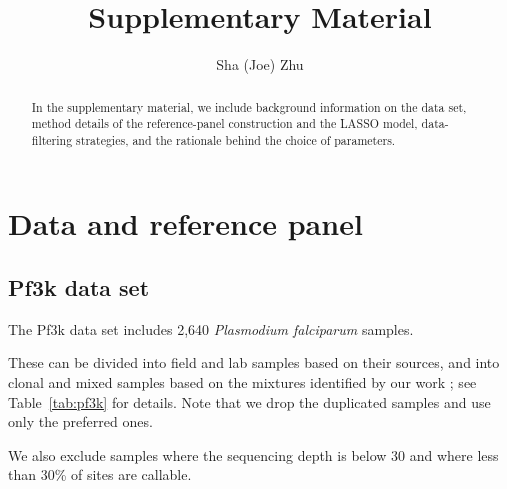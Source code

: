 \documentclass{article}
\title{Supplementary Material}
\author{Sha (Joe) Zhu}
\date{}
\begin{document}
\clearpage

\maketitle
\begin{abstract}
\noindent In the supplementary material, we include background information on the data set, method details of the reference-panel construction and the LASSO model, data-filtering strategies, and the rationale behind the choice of parameters.
\end{abstract}


\tableofcontents


\newpage
\section{Data and reference panel}
\subsection{Pf3k data set}
%

The Pf3k \citep{pf3k} data set includes 2,640 {\it Plasmodium falciparum} samples. %

These can be divided into field and lab samples based on their sources, and into clonal and mixed samples based on the mixtures identified by our work \citep{Zhu2017, Zhu2019}; see Table~\ref{tab:pf3k} for details. Note that we drop the duplicated samples and use only the preferred ones.

We also exclude samples where the sequencing depth is below 30 and where less than 30\% of sites are callable. %


\end{document}
